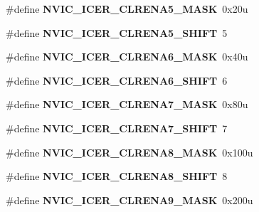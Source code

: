 \begin{DoxyCompactItemize}
\#define {\bfseries N\+V\+I\+C\+\_\+\+I\+C\+E\+R\+\_\+\+C\+L\+R\+E\+N\+A5\+\_\+\+M\+A\+SK}~0x20u
\item 
\mbox{\label{group___n_v_i_c___register___masks_ga825e88881d4ee1d0bec9c7333e7674cb}} 
\#define {\bfseries N\+V\+I\+C\+\_\+\+I\+C\+E\+R\+\_\+\+C\+L\+R\+E\+N\+A5\+\_\+\+S\+H\+I\+FT}~5
\item 
\mbox{\label{group___n_v_i_c___register___masks_gadab47a8f4b0e811c17c5ce92a79571f7}} 
\#define {\bfseries N\+V\+I\+C\+\_\+\+I\+C\+E\+R\+\_\+\+C\+L\+R\+E\+N\+A6\+\_\+\+M\+A\+SK}~0x40u
\item 
\mbox{\label{group___n_v_i_c___register___masks_gaae10f584a53307fc3737d838494b8ac4}} 
\#define {\bfseries N\+V\+I\+C\+\_\+\+I\+C\+E\+R\+\_\+\+C\+L\+R\+E\+N\+A6\+\_\+\+S\+H\+I\+FT}~6
\item 
\mbox{\label{group___n_v_i_c___register___masks_ga56c619b446fb239c09604ce277d3f41a}} 
\#define {\bfseries N\+V\+I\+C\+\_\+\+I\+C\+E\+R\+\_\+\+C\+L\+R\+E\+N\+A7\+\_\+\+M\+A\+SK}~0x80u
\item 
\mbox{\label{group___n_v_i_c___register___masks_ga15b8abc7e590d17213a8cce591d0f911}} 
\#define {\bfseries N\+V\+I\+C\+\_\+\+I\+C\+E\+R\+\_\+\+C\+L\+R\+E\+N\+A7\+\_\+\+S\+H\+I\+FT}~7
\item 
\mbox{\label{group___n_v_i_c___register___masks_gaf644b80bbafecefd8d04f18283b93622}} 
\#define {\bfseries N\+V\+I\+C\+\_\+\+I\+C\+E\+R\+\_\+\+C\+L\+R\+E\+N\+A8\+\_\+\+M\+A\+SK}~0x100u
\item 
\mbox{\label{group___n_v_i_c___register___masks_ga57bb6d50a88cc2522f9b224521c0450a}} 
\#define {\bfseries N\+V\+I\+C\+\_\+\+I\+C\+E\+R\+\_\+\+C\+L\+R\+E\+N\+A8\+\_\+\+S\+H\+I\+FT}~8
\item 
\mbox{\label{group___n_v_i_c___register___masks_gafe4a12c015df1c3b5c366e4dccfbbe69}} 
\#define {\bfseries N\+V\+I\+C\+\_\+\+I\+C\+E\+R\+\_\+\+C\+L\+R\+E\+N\+A9\+\_\+\+M\+A\+SK}~0x200u
\item 

\end{DoxyCompactItemize}
